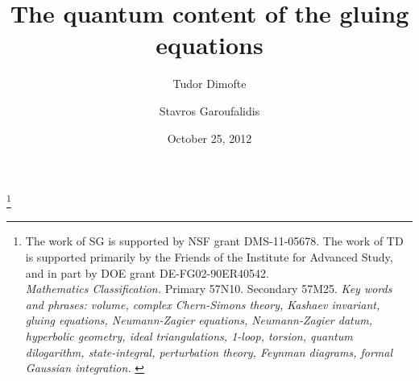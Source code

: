 \documentclass[12pt]{amsart}
\theoremstyle{definition}
\numberwithin{equation}{section}
\begin{document}

\title[The quantum content of the gluing equations]{
The quantum content of the gluing equations}
\author{Tudor Dimofte}
\address{School of Natural Sciences \\
         Institute for Advanced Study  \\
         Princeton, NJ 08540, USA \newline
         \indent Trinity College \\ Cambridge CB2 1TQ \\ UK
        }
\author{Stavros Garoufalidis}
\address{School of Mathematics \\
         Georgia Institute of Technology \\
         Atlanta, GA 30332-0160, USA \newline
         {\tt \url{http://www.math.gatech.edu/~stavros }}}
\thanks{The work of SG is supported by NSF grant DMS-11-05678. The work of 
TD is supported primarily by the Friends of the Institute for Advanced Study, 
and in part by DOE grant DE-FG02-90ER40542. \\
 {\em Mathematics Classification.} Primary 57N10. Secondary 57M25.
\newline
{\em Key words and phrases: volume, complex Chern-Simons theory, Kashaev
invariant, gluing equations, Neumann-Zagier
equations, Neumann-Zagier datum, hyperbolic geometry, ideal triangulations,
1-loop, torsion, quantum dilogarithm, state-integral, 
perturbation theory, Feynman diagrams, formal Gaussian integration.
}
}

\date{October 25, 2012}%
\end{document}
